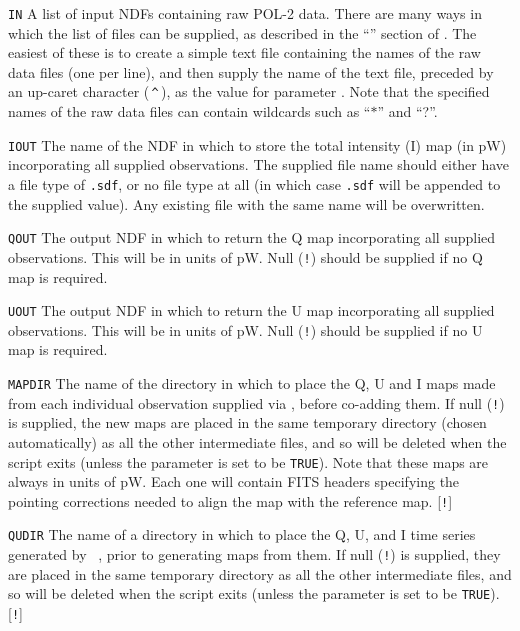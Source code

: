 \begin{aligndesc}
\item[\texttt{IN}] A list of input NDFs containing raw POL-2 data.
  There are many ways in which the list of files can be supplied, as
  described in the ``'' section of . The
  easiest of these is to create a simple text file containing the names of the
  raw data files (one per line), and then supply the name of the
  text file, preceded by an up-caret character (\,\texttt{\^{}}\,), as
  the value for parameter . Note that the specified names of the raw
  data files can contain wildcards such as ``$*$'' and ``?''.

\item[\texttt{IOUT}] The name of the NDF in which to store the
  total intensity (I) map (in pW) incorporating all supplied observations.
  The supplied file name should either have a file type of
  \texttt{.sdf}, or no file type at all (in which case
  \texttt{.sdf} will be appended to the supplied value). Any existing
  file with the same name will be overwritten.

\item[\texttt{QOUT}] The output NDF in which to return the Q map
  incorporating all supplied observations. This will be in units of
  pW. Null (\texttt{!}) should be supplied if no Q map is required.

\item[\texttt{UOUT}] The output NDF in which to return the U map
  incorporating all supplied observations. This will be in units of
  pW. Null (\texttt{!}) should be supplied if no U map is required.

\item[\texttt{MAPDIR}] The name of the directory in which to place the Q,
  U and I maps made from each individual observation supplied via
  , before co-adding them. If null (\texttt{!}) is supplied, the new
  maps are placed in the same temporary directory (chosen automatically)
  as all the other intermediate files, and so will be deleted when the script
  exits (unless the parameter  is set to be \texttt{TRUE}). Note
  that these maps are always in units of pW. Each one will contain FITS
  headers specifying the pointing corrections needed to align the map with
  the reference map. [\texttt{!}]

\item[\texttt{QUDIR}] The name of a directory in which to place the Q, U,
  and I time series generated by \SMURF\ , prior to generating
  maps from them. If null (\texttt{!}) is supplied, they are placed in the same
  temporary directory as all the other intermediate files, and so will
  be deleted when the script exits (unless the parameter  is
  set to be \texttt{TRUE}). [\texttt{!}]
\end{aligndesc}

